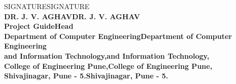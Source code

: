 \begin{center}		%

SIGNATURESIGNATURE\\
\normalsize{\bf{DR. J. V. AGHAVDR. J. V. AGHAV\\
Project GuideHead}\\
Department of Computer EngineeringDepartment of Computer Engineering\\
and Information Technology,and Information Technology,\\
College of Engineering Pune,College of Engineering Pune,\\
Shivajinagar, Pune - 5.Shivajinagar, Pune - 5.}
\end{center}


